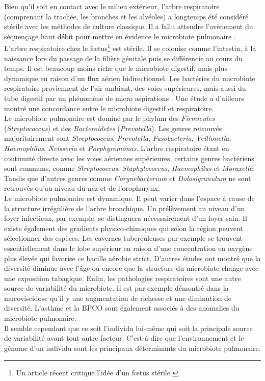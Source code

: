 \documentclass[12pt,a4paper]{article}
\begin{document}
Bien qu'il soit en contact avec le milieu extérieur, l’arbre respiratoire (comprenant la trachée, les bronches et les alvéoles) a longtemps été considéré stérile avec les méthodes de culture classique. Il a fallu attendre l’avènement du séquençage haut débit pour mettre en évidence le microbiote pulmonaire \cite{HoMan2017,Beck,Dicksonb}.\\
L'arbre respiratoire chez le fœtus\footnote{Un article récent critique l'idée d'un fœtus stérile \cite{Perez-Munoz2017}} est stérile. Il se colonise comme l'intestin, à la naissance lors du passage de la filière génitale puis se différencie au cours du temps. Il est beaucoup moins riche que le microbiote digestif, mais plus dynamique en raison d'un flux aérien bidirectionnel.  Les bactéries du microbiote respiratoire proviennent de l’air ambiant, des voies supérieures, mais aussi du tube digestif par un phénomène de micro aspirations \cite{Dickson}. Une étude a d'ailleurs montré une concordance entre le microbiote digestif et respiratoire\cite{Dickson}.\\
Le microbiote pulmonaire est dominé par le phylum des \textit{Firmicutes} (\textit{Streptococcus}) et des \textit{Bacteroidetes} (\textit{Prevotella}). Les genres retrouvés majoritairement sont \textit{Streptococcus}, \textit{Prevotella}, \textit{Fusobacteria}, \textit{Veillonella}, \textit{Haemophilus}, \textit{Neisseria} et \textit{Porphyromonas}.
L’arbre respiratoire étant en continuité directe avec les voies aériennes supérieures, certains genres bactériens sont communs, comme \textit{Streptococcus}, \textit{Staphylococcus}, \textit{Haemophilus} et \textit{Moraxella}. Tandis que d’autres genres comme \textit{Corynebacterium} et \textit{Dolosigranulum} ne sont retrouvés qu’au niveau du nez et de l'oropharynx. \\
Le microbiote pulmonaire est dynamique. Il peut varier dans l'espace à cause de la structure irrégulière de l'arbre bronchique. Un prélèvement au niveau d'un foyer infectieux, par exemple, se distinguera nécessairement d'un foyer sain. Il existe également des gradients physico-chimiques qui selon la région peuvent sélectionner des espèces. Les cavernes tuberculeuses par exemple se trouvent essentiellement dans le lobe supérieur en raison d'une concentration en oxygène plus élevée qui favorise ce bacille aérobie strict. D'autres études \cite{Frayman2017,Coburn2015} ont montré que la diversité diminue avec l'âge ou encore que la structure du microbiote change avec une exposition tabagique.
Enfin, les pathologies respiratoires\cite{HoMan2017} sont une autre source de variabilité du microbiote. Il est par exemple démontré dans la mucoviscidose qu'il y une augmentation de richesse et une diminution de diversité. L'asthme et la BPCO sont également associés à des anomalies du microbiote pulmonaire\cite{Dicksona,Nguyen2015}.  \\
Il semble cependant que ce soit l'individu lui-même qui soit la principale source de variabilité avant tout autre facteur\cite{Whelan2017}. C'est-à-dire que l'environnement et le génome d'un individu sont les principaux déterminants du microbiote pulmonaire.
\end{document}
